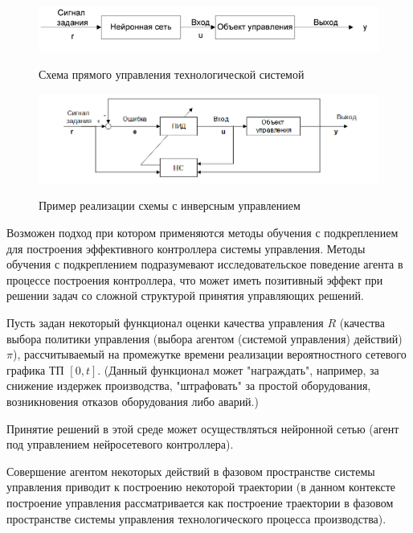 \begin{figure}[H]
	\caption{Схема прямого управления технологической системой}
	\includegraphics[scale=0.5]{images/part7/chapter_enterprise/nncontrol_direct.png}
	\label{fig:nncontrol_direct}
\end{figure}

\begin{figure}[H]
	\caption{Пример реализации схемы с инверсным управлением}
	\includegraphics[scale=0.5]{images/part7/chapter_enterprise/nncontrol_inverse.png}
	\label{fig:nncontrol_inverse}
\end{figure}

Возможен подход при котором применяются методы обучения с подкреплением для построения эффективного контроллера системы управления. Методы обучения с подкреплением подразумевают исследовательское поведение агента в процессе построения контроллера, что может иметь позитивный эффект при решении задач со сложной структурой принятия управляющих решений.

Пусть задан некоторый функционал оценки качества управления $R$ (качества выбора политики управления (выбора агентом (системой управления) действий) $\pi$), рассчитываемый на промежутке времени реализации вероятностного сетевого графика ТП $[0,t]$. (Данный функционал может "награждать"{}, например, за снижение издержек производства, "штрафовать"{} за простой оборудования, возникновения отказов оборудования либо аварий.)

Принятие решений в этой среде может осуществляться нейронной сетью (агент под управлением нейросетевого контроллера).

Совершение агентом некоторых действий в фазовом пространстве системы управления приводит к построению некоторой траектории (в данном контексте построение управления рассматривается как построение траектории в фазовом пространстве системы управления технологического процесса производства).

